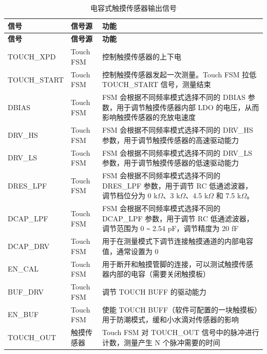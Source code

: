 \documentclass[main\_\_CN.tex]{subfiles}
\begin{document}
\begin{longtable}[c]{|p{3cm}|p{2cm}|p{11cm}| }
    \caption{电容式触摸传感器输出信号}
    \label{tab:tchsen-output-signal}
    \\\hline
    \rowcolor{lightgray}
    \textbf{信号} & \textbf{信号源}& \textbf{功能}\\ 
    \hline
    \endfirsthead
    \hline
    \rowcolor{lightgray}
    \textbf{信号} & \textbf{信号源}& \textbf{功能}\\ 
    \hline
    \endhead
    \endfoot
    \endlastfoot
    TOUCH\_XPD & Touch FSM & 控制触摸传感器的上下电\\\hline
    TOUCH\_START & Touch FSM & 控制触摸传感器发起一次测量。Touch FSM 拉低 TOUCH\_START 信号，测量结束 \\\hline
    DBIAS & Touch FSM & FSM 会根据不同频率模式选择不同的 DBIAS 参数，用于调节触摸传感器内部 LDO 的电压，从而影响触摸传感器的充放电速度 \\\hline
    DRV\_HS & Touch FSM & FSM 会根据不同频率模式选择不同的 DRV\_HS 参数，用于调节触摸传感器的高速驱动能力 \\\hline
    DRV\_LS & Touch FSM & FSM 会根据不同频率模式选择不同的 DRV\_LS 参数，用于调节触摸传感器的低速驱动能力 \\\hline
    DRES\_LPF & Touch FSM & FSM 会根据不同频率模式选择不同的 DRES\_LPF 参数，用于调节 RC 低通滤波器，调节档位分为 0 k$\Omega$、3 k$\Omega$、4.5 k$\Omega$ 和 7.5 k$\Omega$。 \\\hline 
    DCAP\_LPF & Touch FSM & FSM 会根据不同频率模式选择不同的 DCAP\_LPF 参数，用于调节 RC 低通滤波器，调节范围为 0 \verb+~+ 2.54 pF，调节精度为 20 fF \\\hline
    DCAP\_DRV & Touch FSM & 用于在测量模式下调节连接触摸通道的内部电容值，通常设置为 0    \\\hline 
    EN\_CAL & Touch FSM & 用于断开和触摸管脚的连接，可以测试触摸传感器内部的电容（需要关闭触摸板）\\\hline
    BUF\_DRV & Touch FSM & 调节 TOUCH BUFF 的驱动能力\\\hline
    EN\_BUF & Touch FSM & 使能 TOUCH BUFF（软件可配置的一块触摸板）用于防潮模式，缓和小水滴对传感器的影响\\\hline
    TOUCH\_OUT & 触摸传感器 & Touch FSM 对 TOUCH\_OUT 信号中的脉冲进行计数，测量产生 N 个脉冲需要的时间\\\hline
\end{longtable}


\end{document}
